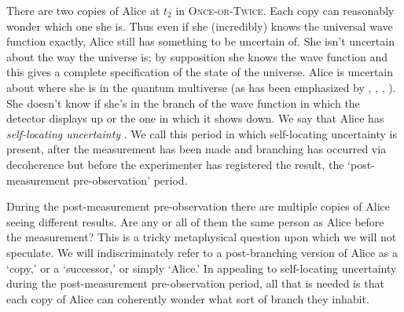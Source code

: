 \documentclass[12pt,onecolumn,secnumarabic,amsmath,amssymb,balancelastpage,nofootinbib]{article}
\begin{document}
There are two copies of Alice at $t_2$ in \textsc{Once-or-Twice}. Each copy can reasonably wonder which one she is. Thus even if she (incredibly) knows the universal wave function exactly, Alice still has something to be uncertain of.  She isn't uncertain about the way the universe is; by supposition she knows the wave function and this gives a complete specification of the state of the universe.  Alice is uncertain about where she is in the quantum multiverse (as has been emphasized by \citeauthor{vaidman1998} \citeyear{vaidman1998}, \citeyear{vaidman2011}, \citeyear{vaidman2014}, \citeyear{vaidmanSEP}).  She doesn't know if she's in the branch of the wave function in which the detector displays up or the one in which it shows down.  We say that Alice has \emph{self-locating uncertainty} \citep[see][]{lewis1979, bostrom2002}.  We call this period in which self-locating uncertainty is present, after the measurement has been made and branching has occurred via decoherence but before the experimenter has registered the result, the `post-measurement pre-observation' period.

During the post-measurement pre-observation there are multiple copies of Alice seeing different results.  Are any or all of them the same person as Alice before the measurement?  This is a tricky metaphysical question upon which we will not speculate.  We will indiscriminately refer to a post-branching version of Alice as a `copy,' or a `successor,' or simply `Alice.'  In appealing to self-locating uncertainty during the post-measurement pre-observation period, all that is needed is that each copy of Alice can coherently wonder what sort of branch they inhabit.
\end{document}
